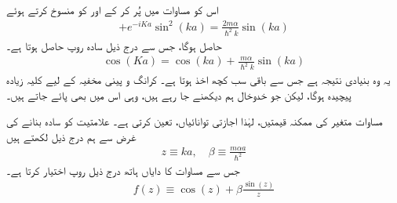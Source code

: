 اس کو مساوات  میں پُر کر کے اور  کو منسوخ کرتے ہوئے 
\begin{align*}
	[e^{iKa}-\cos(ka)][1-e^{-iKa}\cos(ka)] + e^{-iKa}\sin^{2}(ka) = \frac{2m\alpha}{\hslash^{2}k}\sin(ka)
\end{align*}
حاصل ہوگا، جس سے درج ذیل سادہ روپ حاصل ہوتا ہے۔
\begin{align}\label{مساوات_متماثل_سادہ_روپ_بلوخ}
	\cos(Ka) = \cos(ka) + \frac{m\alpha}{\hslash^{2}k}\sin(ka)
\end{align}
یہ وہ بنیادی نتیجہ ہے جس سے باقی سب کچھ اخذ ہوتا ہے۔ کرانگ و پینی مخفیہ کے لیے کلیہ زیادہ پیچیدہ ہوگا، لیکن جو خدوخال ہم دیکھنے جا رہے ہیں، وہی اس میں بھی پائے جاتے ہیں۔

 مساوات متغیر  کی ممکنہ قیمتیں، لہٰذا اجازتی توانائیاں، تعین کرتی ہے۔ علامتیت کو سادہ بنانے کی غرض سے ہم درج ذیل لکھتے ہیں 
\begin{align}
	z \equiv ka, \quad \beta \equiv \frac{m\alpha a}{\hslash^{2}}
\end{align}
جس سے مساوات  کا دایاں ہاتھ درج ذیل روپ اختیار کرتا ہے۔
\begin{align}\label{مساوات_متماثل_بے_بعدی_ناپ}
	f(z) \equiv \cos(z) + \beta\frac{\sin(z)}{z}
\end{align}

